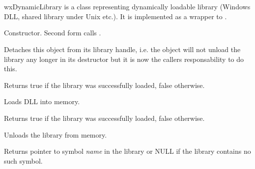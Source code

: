 
\section{}\label{wxdynamiclibrary}

wxDynamicLibrary is a class representing dynamically loadable library
(Windows DLL, shared library under Unix etc.). It is implemented as a wrapper
to .



\label{wxdynamiclibrarywxdynamiclibrary}



Constructor. Second form calls .

\label{wxdynamiclibrarydetach}


Detaches this object from its library handle, i.e. the object will not unload
the library any longer in its destructor but it is now the callers
responsability to do this.

\label{wxdynamiclibraryisloaded}


Returns true if the library was successfully loaded, false otherwise.

\label{wxdynamiclibraryload}


Loads DLL into memory.

Returns true if the library was successfully loaded, false otherwise.

\label{wxdynamiclibraryunload}


Unloads the library from memory.

\label{wxdynamiclibrarygetsymbol}


Returns pointer to symbol {\it name} in the library or NULL if the library
contains no such symbol.


